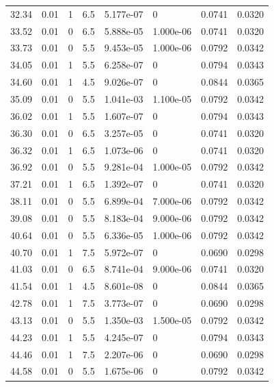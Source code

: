 \documentclass[preview]{standalone}
\begin{document}
{{{\begin{tabular}{L{1.2cm}C{1.2cm} C{0.3cm}C{0.5cm} C{1.4cm}C{1.4cm} C{1.4cm}C{1.4cm}}
  32.34  &  0.01  & 1     & 6.5 &  5.177e-07  & 0  & 0.0741 &  0.0320   \\ 
  33.52  &  0.01  & 0     & 6.5 &  5.888e-05  & 1.000e-06  & 0.0741 &  0.0320   \\ 
  33.73  &  0.01  & 0     & 5.5 &  9.453e-05  & 1.000e-06  & 0.0792 &  0.0342   \\ 
  34.05  &  0.01  & 1     & 5.5 &  6.258e-07  & 0  & 0.0794 &  0.0343   \\ 
  34.60  &  0.01  & 1     & 4.5 &  9.026e-07  & 0  & 0.0844 &  0.0365   \\ 
  35.09  &  0.01  & 0     & 5.5 &  1.041e-03  & 1.100e-05  & 0.0792 &  0.0342   \\ 
  36.02  &  0.01  & 1     & 5.5 &  1.607e-07  & 0  & 0.0794 &  0.0343   \\ 
  36.30  &  0.01  & 0     & 6.5 &  3.257e-05  & 0  & 0.0741 &  0.0320   \\ 
  36.32  &  0.01  & 1     & 6.5 &  1.073e-06  & 0  & 0.0741 &  0.0320   \\ 
  36.92  &  0.01  & 0     & 5.5 &  9.281e-04  & 1.000e-05  & 0.0792 &  0.0342   \\ 
  37.21  &  0.01  & 1     & 6.5 &  1.392e-07  & 0  & 0.0741 &  0.0320   \\ 
  38.11  &  0.01  & 0     & 5.5 &  6.899e-04  & 7.000e-06  & 0.0792 &  0.0342   \\ 
  39.08  &  0.01  & 0     & 5.5 &  8.183e-04  & 9.000e-06  & 0.0792 &  0.0342   \\ 
  40.64  &  0.01  & 0     & 5.5 &  6.336e-05  & 1.000e-06  & 0.0792 &  0.0342   \\ 
  40.70  &  0.01  & 1     & 7.5 &  5.972e-07  & 0  & 0.0690 &  0.0298   \\ 
  41.03  &  0.01  & 0     & 6.5 &  8.741e-04  & 9.000e-06  & 0.0741 &  0.0320   \\ 
  41.54  &  0.01  & 1     & 4.5 &  8.601e-08  & 0  & 0.0844 &  0.0365   \\ 
  42.78  &  0.01  & 1     & 7.5 &  3.773e-07  & 0  & 0.0690 &  0.0298   \\ 
  43.13  &  0.01  & 0     & 5.5 &  1.350e-03  & 1.500e-05  & 0.0792 &  0.0342   \\ 
  44.23  &  0.01  & 1     & 5.5 &  4.245e-07  & 0  & 0.0794 &  0.0343   \\ 
  44.46  &  0.01  & 1     & 7.5 &  2.207e-06  & 0  & 0.0690 &  0.0298   \\ 
  44.58  &  0.01  & 0     & 5.5 &  1.675e-06  & 0  & 0.0792 &  0.0342   \\ 

\end{tabular}}}}
\end{document}
